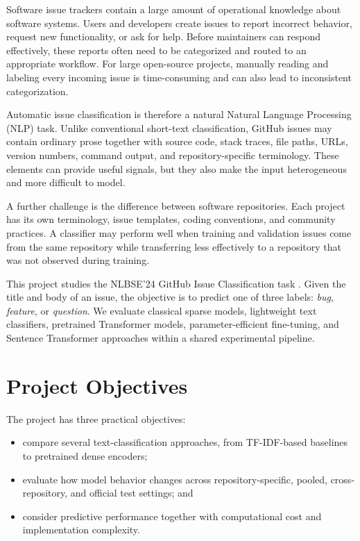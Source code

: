 Software issue trackers contain a large amount of operational knowledge about software systems. Users and developers create issues to report incorrect behavior, request new functionality, or ask for help. Before maintainers can respond effectively, these reports often need to be categorized and routed to an appropriate workflow. For large open-source projects, manually reading and labeling every incoming issue is time-consuming and can also lead to inconsistent categorization.

Automatic issue classification is therefore a natural Natural Language Processing (NLP) task. Unlike conventional short-text classification, GitHub issues may contain ordinary prose together with source code, stack traces, file paths, URLs, version numbers, command output, and repository-specific terminology. These elements can provide useful signals, but they also make the input heterogeneous and more difficult to model.

A further challenge is the difference between software repositories. Each project has its own terminology, issue templates, coding conventions, and community practices. A classifier may perform well when training and validation issues come from the same repository while transferring less effectively to a repository that was not observed during training.

This project studies the NLBSE'24 GitHub Issue Classification task \cite{nlbse2024issue}. Given the title and body of an issue, the objective is to predict one of three labels: \textit{bug}, \textit{feature}, or \textit{question}. We evaluate classical sparse models, lightweight text classifiers, pretrained Transformer models, parameter-efficient fine-tuning, and Sentence Transformer approaches within a shared experimental pipeline.

\section{Project Objectives}
The project has three practical objectives:
\begin{itemize}[leftmargin=1.5em]
    \item compare several text-classification approaches, from TF-IDF-based baselines to pretrained dense encoders;
    \item evaluate how model behavior changes across repository-specific, pooled, cross-repository, and official test settings; and
    \item consider predictive performance together with computational cost and implementation complexity.
\end{itemize}

